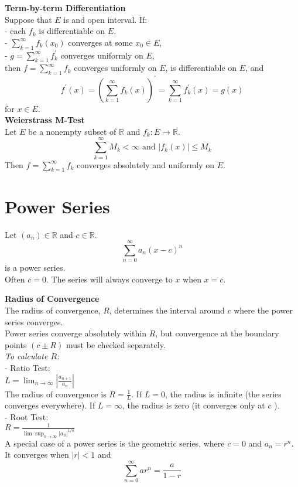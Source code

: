 \documentclass[a4paper, 10pt]{article}
\begin{document}
\begin{multicols*}{3}
\textbf{Term-by-term Differentiation}\\
Suppose that $E$ is and open interval. If:\\
- each $f_k$ is differentiable on $E$. \\
- $\sum_{k=1}^{\infty} f_k\left(x_0\right)$ converges at some $x_0 \in E$,\\
- $g=\sum_{k=1}^{\infty} f_k^{\prime}$ converges uniformly on $E$, \\
then $f=\sum_{k=1}^{\infty} f_k$ converges uniformly on $E$, is differentiable on $E$, and
$$
f^{\prime}(x)=\left(\sum_{k=1}^{\infty} f_k(x)\right)^{\prime}=\sum_{k=1}^{\infty} f_k^{\prime}(x)=g(x)
$$
for $x \in E$. \\

\textbf{Weierstrass M-Test}\\
Let $E$ be a nonempty subset of $\mathbb{R}$ and $f_k: E \rightarrow \mathbb{R}$.\\
$$\sum_{k=1}^{\infty} M_k<\infty \text{ and } \left|f_k(x)\right| \leq M_k$$
Then $f=\sum_{k=1}^{\infty} f_k$ converges absolutely and uniformly on $E$.

\section*{Power Series}

Let $\left(a_n\right)\in\mathbb{R}$ and $c \in \mathbb{R}$. 
$$
\sum_{n=0}^{\infty} a_n(x-c)^n
$$
is a power series.\\
Often $c=0$.
The series will always converge to $x$ when $x=c$. 

\textbf{Radius of Convergence}\\
The radius of convergence, $R$, determines the interval around $c$ where the power series converges. \\
Power series converge absolutely within $R$, but convergence at the boundary points $(c \pm R)$ must be checked separately.\\
\textit{To calculate $R$:}\\
- Ratio Test: \\
$L=\lim _{n \rightarrow \infty}\left|\frac{a_{n+1}}{a_n}\right|$\\
The radius of convergence is $R=\frac{1}{L}$. If $L=0$, the radius is infinite (the series converges everywhere). If $L=\infty$, the radius is zero (it converges only at $c$ ).\\
- Root Test: \\
$R=\frac{1}{\lim \sup _{n \rightarrow \infty}\left|a_n\right|^{1 / n}}$\\
A special case of a power series is the geometric series, where $c=0$ and $a_n=r^n$. It converges when $|r|<1$ and 
$$\sum_{n=0}^{\infty} a r^n = \frac{a}{1-r}$$


\end{multicols*}
\end{document}

